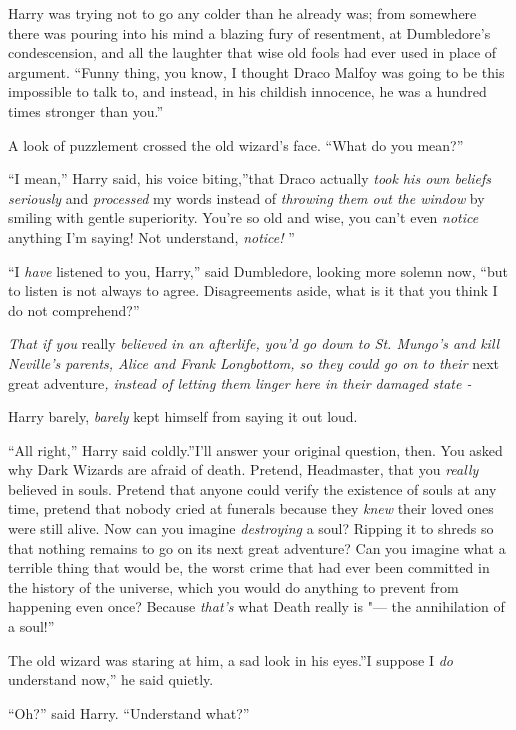 Harry was trying not to go any colder than he already was; from
somewhere there was pouring into his mind a blazing fury of resentment,
at Dumbledore's condescension, and all the laughter that wise old fools
had ever used in place of argument. ``Funny thing, you know, I thought
Draco Malfoy was going to be this impossible to talk to, and instead, in
his childish innocence, he was a hundred times stronger than you.''

A look of puzzlement crossed the old wizard's face. ``What do you
mean?''

``I mean,'' Harry said, his voice biting,''that Draco actually
\emph{took his own beliefs seriously} and \emph{processed} my words
instead of \emph{throwing them out the window} by smiling with gentle
superiority. You're so old and wise, you can't even \emph{notice}
anything I'm saying! Not understand, \emph{notice!} ''

``I \emph{have} listened to you, Harry,'' said Dumbledore, looking more
solemn now, ``but to listen is not always to agree. Disagreements aside,
what is it that you think I do not comprehend?''

\emph{That if you} really \emph{believed in an afterlife, you'd go down
to St. Mungo's and kill Neville's parents, Alice and Frank Longbottom,
so they could go on to their} next great adventure\emph{, instead of
letting them linger here in their damaged state -}

Harry barely, \emph{barely} kept himself from saying it out loud.

``All right,'' Harry said coldly.''I'll answer your original question,
then. You asked why Dark Wizards are afraid of death. Pretend,
Headmaster, that you \emph{really} believed in souls. Pretend that
anyone could verify the existence of souls at any time, pretend that
nobody cried at funerals because they \emph{knew} their loved ones were
still alive. Now can you imagine \emph{destroying} a soul? Ripping it to
shreds so that nothing remains to go on its next great adventure? Can
you imagine what a terrible thing that would be, the worst crime that
had ever been committed in the history of the universe, which you would
do anything to prevent from happening even once? Because \emph{that's}
what Death really is "--- the annihilation of a soul!''

The old wizard was staring at him, a sad look in his eyes.''I suppose I
\emph{do} understand now,'' he said quietly.

``Oh?'' said Harry. ``Understand what?''

